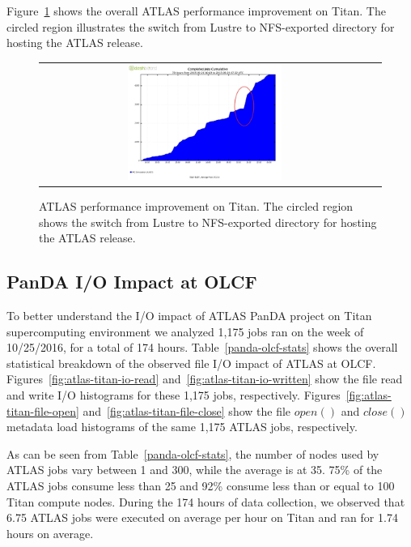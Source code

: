 Figure~\ref{fig:atlas-perf-improvement} shows the overall ATLAS performance
improvement on Titan. The circled region illustrates the switch from Lustre to
NFS-exported directory for hosting the ATLAS release.

\begin{figure}[!htb]
    \centering
    \begin{tabular}{cc}
        {\includegraphics[width=0.48\textwidth]{figures/panda-completed-jobs-sw-move.pdf}}\\
    \end{tabular}
    \caption{ATLAS performance improvement on Titan. The circled region shows the switch from Lustre to NFS-exported directory for hosting the ATLAS release.}
\label{fig:atlas-perf-improvement}
\end{figure}


\subsection{PanDA I/O Impact at OLCF}

To better understand the I/O impact of ATLAS PanDA project on Titan
supercomputing environment we analyzed 1,175 jobs ran on the week of 10/25/2016,
for a total of 174 hours. Table~\ref{panda-olcf-stats} shows the overall
statistical breakdown of the observed file I/O impact of ATLAS at OLCF\@.
Figures~\ref{fig:atlas-titan-io-read} and~\ref{fig:atlas-titan-io-written} show
the file read and write I/O histograms for these 1,175 jobs, respectively.
Figures~\ref{fig:atlas-titan-file-open} and~\ref{fig:atlas-titan-file-close}
show the file $open()$ and $close()$ metadata load histograms of the same 1,175
ATLAS jobs, respectively.

As can be seen from Table~\ref{panda-olcf-stats}, the number of nodes used by
ATLAS jobs vary between 1 and 300, while the average is at 35. 75\% of the
ATLAS jobs consume less than 25 and 92\% consume less than or equal to 100
Titan compute nodes. During the 174 hours of data collection, we observed that
6.75 ATLAS jobs were executed on average per hour on Titan and ran for
1.74 hours on average.

